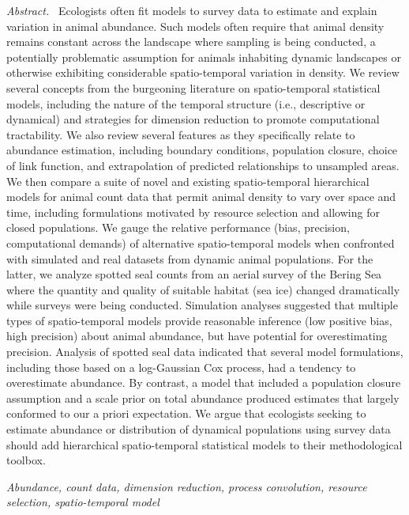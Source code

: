 \documentclass[12pt,english]{article}
\begin{document}
\begin{spacing}{1.9}
{\em Abstract.\ }  Ecologists often fit models to survey data to estimate and explain variation in animal abundance. Such models often require that animal density remains constant across the landscape where sampling is being conducted, a potentially problematic assumption for animals inhabiting dynamic landscapes or otherwise exhibiting considerable spatio-temporal variation in density.  We review several concepts from the burgeoning literature on spatio-temporal statistical models, including the nature of the temporal structure (i.e., descriptive or dynamical) and strategies for dimension reduction to promote computational tractability.  We also review several features as they specifically relate to abundance estimation, including boundary conditions, population closure, choice of link function, and extrapolation of predicted relationships to unsampled areas.
We then compare a suite of novel and existing spatio-temporal hierarchical models for animal count data that permit animal density to vary over space and time, including formulations motivated by resource selection and allowing for closed populations.  We gauge the relative performance (bias, precision, computational demands) of alternative spatio-temporal models when confronted with simulated and real datasets from dynamic animal populations.  For the latter, we analyze spotted seal counts from an aerial survey of the Bering Sea where the quantity and quality of suitable habitat (sea ice) changed dramatically while surveys were being conducted.  Simulation analyses suggested that multiple types of spatio-temporal models provide reasonable inference (low positive bias, high precision) about animal abundance, but have potential for overestimating precision.  Analysis of spotted seal data indicated that several model formulations, including those based on a log-Gaussian Cox process, had a tendency to overestimate abundance.  By contrast, a model that included a population closure assumption and a scale prior on total abundance produced estimates that largely conformed to our a priori expectation. We argue that ecologists seeking to estimate abundance or distribution of dynamical populations using survey data should add hierarchical spatio-temporal statistical models to their methodological toolbox.


{\em Abundance, count data, dimension reduction, process convolution, resource selection, spatio-temporal model}



\def\VAR{{\rm Var}\,}
\def\COV{{\rm Cov}\,}
\def\Prob{{\rm P}\,}




\end{spacing}
\end{document}
